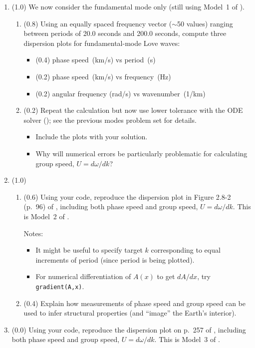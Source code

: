 \documentclass[11pt,titlepage,fleqn]{article}
\begin{document}
\begin{enumerate}

\item (1.0) We now consider the fundamental mode only (still using Model~1 of ).

\begin{enumerate}
\item (0.8) Using an equally spaced frequency vector ($\sim$50 values) ranging between periods of 20.0 seconds and 200.0 seconds, compute three dispersion plots for fundamental-mode Love waves:
%
\begin{itemize}
\item (0.4) phase speed~(km/s) vs period~(s)
\item (0.2) phase speed~(km/s) vs frequency~(Hz)
\item (0.2) angular frequency (rad/s) vs wavenumber~(1/km)
\end{itemize}

\item (0.2) Repeat the calculation but now use lower tolerance with the ODE solver (\sfind); see the previous modes problem set for details.
%
\begin{itemize}
\item Include the plots with your solution.
\item Why will numerical errors be particularly problematic for calculating group speed, $U = d\omega/dk$?
\end{itemize}

\end{enumerate}


\item (1.0)
%
\begin{enumerate}
\item (0.6) Using your code, reproduce the dispersion plot in Figure 2.8-2 (p.~96) of \citet{SteinWysession}, including both phase speed and group speed, $U = d\omega/dk$. This is Model~2 of .

Notes:
%
\begin{itemize}
\item It might be useful to specify target $k$ corresponding to equal increments of period (since period is being plotted).
\item For numerical differentiation of $A(x)$ to get $dA/dx$, try \verb+gradient(A,x)+.
\end{itemize}

\item (0.4) Explain how measurements of phase speed and group speed can be used to infer structural properties (and ``image'' the Earth's interior).
\end{enumerate}


\item (0.0) Using your code, reproduce the dispersion plot on p.~257 of \citet{AkiRichardsE2}, including both phase speed and group speed, $U = d\omega/dk$. This is Model~3 of .


\end{enumerate}
\end{document}
